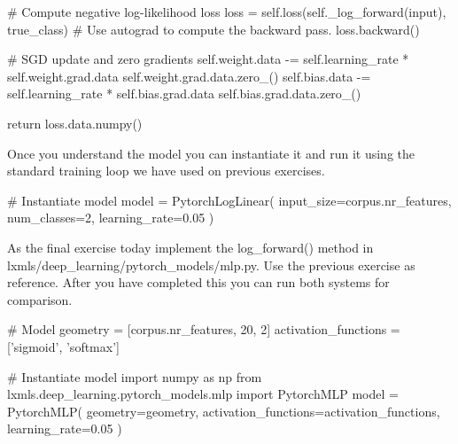 \begin{exercise}
\begin{python}
        # Compute negative log-likelihood loss
        loss = self.loss(self._log_forward(input), true_class)
        # Use autograd to compute the backward pass.
        loss.backward()

        # SGD update and zero gradients
        self.weight.data -= self.learning_rate * self.weight.grad.data
        self.weight.grad.data.zero_()
        self.bias.data -= self.learning_rate * self.bias.grad.data
        self.bias.grad.data.zero_()

        return loss.data.numpy()
\end{python}
Once you understand the model you can instantiate it and run it using the standard training loop we have used on previous exercises.
\begin{python}
# Instantiate model
model = PytorchLogLinear(
    input_size=corpus.nr_features,
    num_classes=2,
    learning_rate=0.05
)
\end{python}
\end{exercise}

\begin{exercise}
As the final exercise today implement the log\_forward() method in lxmls/deep\_learning/pytorch\_models/mlp.py. Use the previous exercise as reference. After you have completed this you can run both systems for comparison. 
\begin{python}
# Model
geometry = [corpus.nr_features, 20, 2]
activation_functions = ['sigmoid', 'softmax']

# Instantiate model
import numpy as np
from lxmls.deep_learning.pytorch_models.mlp import PytorchMLP
model = PytorchMLP(
    geometry=geometry,
    activation_functions=activation_functions,
    learning_rate=0.05
)
\end{python}
\end{exercise}
